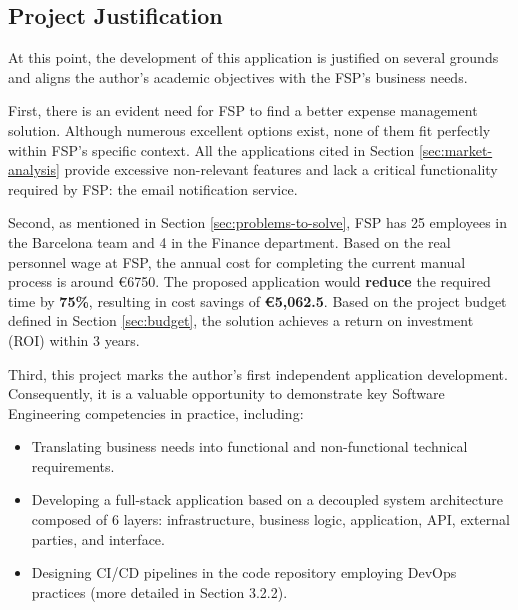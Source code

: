 \subsection{Project Justification}
\label{sec:project-justification}

At this point, the development of this application is justified on several grounds and aligns the author's academic objectives with the FSP's business needs. 

First, there is an evident need for FSP to find a better expense management solution. Although numerous excellent options exist, none of them fit perfectly within FSP's specific context. All the applications cited in Section \ref{sec:market-analysis} provide excessive non-relevant features and lack a critical functionality required by FSP: the email notification service.

Second, as mentioned in Section \ref{sec:problems-to-solve}, FSP has 25 employees in the Barcelona team and 4 in the Finance department. Based on the real personnel wage at FSP, the annual cost for completing the current manual process is around €6750. The proposed application would \textbf{reduce} the required time by \textbf{75\%}, resulting in cost savings of \textbf{€5,062.5}. Based on the project budget defined in Section \ref{sec:budget}, the solution achieves a return on investment (ROI) within 3 years.

Third, this project marks the author's first independent application development. Consequently, it is a valuable opportunity to demonstrate key Software Engineering competencies in practice, including:

\begin{itemize} [leftmargin=0.75cm, noitemsep]
    
    \item Translating business needs into functional and non-functional technical requirements. 
    
    \item Developing a full-stack application based on a decoupled system architecture composed of 6 layers: infrastructure,  business logic, application, API, external parties, and interface. 

    \item Designing CI/CD pipelines in the code repository employing DevOps practices (more detailed in Section 3.2.2). 

\end{itemize}
